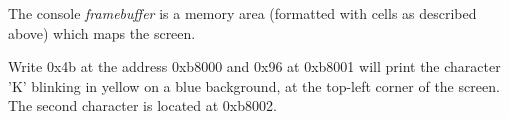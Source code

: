 The console \emph{framebuffer} is a memory area (formatted with cells
as described above) which maps the screen.

Write 0x4b at the address 0xb8000 and 0x96 at 0xb8001 will print the
character 'K' blinking in yellow on a blue background, at the top-left corner
of the screen. The second character is located at 0xb8002.

%
%









%
%




